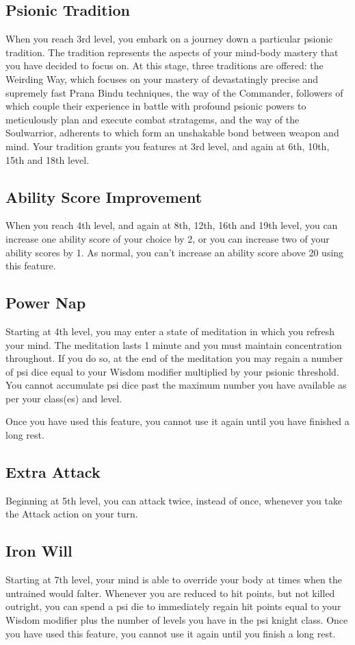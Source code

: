 \subsection{Psionic Tradition}
When you reach 3rd level,
you embark on a journey down a particular
psionic tradition.
The tradition represents the aspects of
your mind-body mastery that you have decided
to focus on.
At this stage, three traditions are offered:
the Weirding Way, which focuses on your mastery
of devastatingly precise and supremely fast
Prana Bindu techniques,
the way of the Commander,
followers of which couple their experience in battle
with profound psionic powers to meticulously
plan and execute combat stratagems,
and the way of the Soulwarrior,
adherents to which form an unshakable bond between weapon and mind.
Your tradition grants you features at 3rd level,
and again at 6th, 10th, 15th and 18th level.

\subsection{Ability Score Improvement}
When you reach 4th level,
and again at 8th, 12th, 16th and 19th level,
you can increase one ability score of your choice by 2,
or you can increase two of your ability scores by 1.
As normal,
you can't increase an ability score above 20 using this feature.

\subsection{Power Nap}
Starting at 4th level,
you may enter a state of meditation
in which you refresh your mind.
The meditation lasts 1 minute and
you must maintain concentration throughout.
If you do so,
at the end of the meditation you may regain a number of psi dice
equal to your Wisdom modifier multiplied by your psionic threshold.
You cannot accumulate psi dice past the maximum number you have available
as per your class(es) and level.

Once you have used this feature,
you cannot use it again until you have finished a long rest.

\subsection{Extra Attack}
Beginning at 5th level, you can attack twice,
instead of once,
whenever you take the Attack action on your turn.

\subsection{Iron Will}
Starting at 7th level,
your mind is able to override your body at times
when the untrained would falter.
Whenever you are reduced to hit points,
but not killed outright,
you can spend a psi die to immediately regain hit points
equal to your Wisdom modifier plus the number of levels
you have in the psi knight class.
Once you have used this feature,
you cannot use it again until you finish a long rest.

